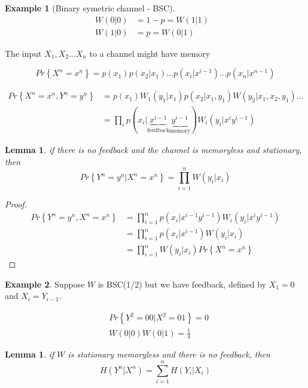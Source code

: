 \documentclass{article}
\newtheorem{lemma}[theorem]{Lemma}
\theoremstyle{definition} %
\newtheorem{example}{Example}
\renewcommand{\Pr}[1]{Pr\left\{#1\right\}}
\begin{document}
\begin{example}[Binary symetric channel - BSC]
  \begin{align*}
    W(0|0) &= 1 - p = W(1|1)&\\
    W(1|0) &= p =W(0|1)
  \end{align*}
\end{example}

The input $X_1, X_2 \dots X_n$ to a channel might have memory

\[
  \Pr{X^n = x^n} = p(x_1)p(x_2 | x_1) \dots p(x_i | x^{i-1}) \dots p(x_n|x^{n-1})
\]

\begin{align*}
  \Pr{X^n=x^n, Y^n=y^n} &= p(x_1)W_1(y_1|x_1)p(x_2|x_1,y_1)W(y_2|x_1,x_2,y_1)\dots\\
  &= \prod_i p(x_i|
  \underbrace{x^{i-1}}_{\text{feedback}}
  \underbrace{y^{i-1}}_{\text{memory}}
  )W_i(y_i|x^iy^{i-1})
\end{align*}

\begin{lemma}
  if there is no feedback and the channel is memoryless and stationary, then
  \[
    \Pr{Y^n=y^n | X^n=x^n} = \prod_{i=1}^n W(y_i|x_i)
  \]
\end{lemma}

\begin{proof}
  \begin{align*}
    \Pr{Y^n=y^n, X^n=x^n} &= \prod_{i=1}^n p(x_i|x^{i-1}y^{i-1})W_i(y_i|x^iy^{i-1})\\
    &= \prod_{i=1}^n p(x_i|x^{i-1})W(y_i|x_i)\\
    &= \prod_{i=1}^n W(y_i|x_i) \Pr{X^n=x^n}
  \end{align*}
\end{proof}

\begin{example}
  Suppose $W$ is BSC(1/2) but we have feedback, defined by $X_1=0$ and $X_i=Y_{i-1}$.

  \begin{align*}
    &\Pr{Y^2=00|X^2=01} = 0\\
    &W(0|0)W(0|1) = \frac 1 4
  \end{align*}

\end{example}

\begin{lemma}
  if $W$ is stationary memoryless and there is no feedback, then
  \[
    H(Y^n|X^n) = \sum_{i=1}^n H(Y_i|X_i)
  \]

\end{lemma}
\end{document}
